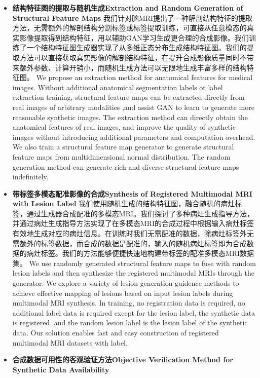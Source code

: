 \documentclass[letterpaper]{article} %
\begin{document}
\begin{itemize}
	\item \textbf{结构特征图的提取与随机生成Extraction and Random Generation of Structural Feature Maps}
	我们针对脑MRI提出了一种解剖结构特征的提取方法，无需额外的解剖结构分割标签或标签提取训练，可直接从任意模态的真实影像提取得到结构特征，用以辅助GAN学习生成更合理的合成影像。我们训练了一个结构特征图生成器实现了从多维正态分布生成结构特征图。我们的提取方法可以直接获取真实影像的解剖结构特征，在提升合成影像质量同时不带来额外参数、计算开销小，而随机生成方法可以无限地生成丰富多样的结构特征图。
	We propose an extraction method for anatomical features for medical images. Without additional anatomical segmentation labels or label extraction training, structural feature maps can be extracted directly from real images of arbitrary modalities ,and assist GAN to learn to generate more reasonable synthetic images. The extraction method can directly obtain the anatomical features of real images, and improve the quality of synthetic images without introducing additional parameters and computation overhead. We also train a structural feature map generator to generate structural feature maps from multidimensional normal distribution. The random generation method can generate rich and diverse structural feature maps indefinitely.
	\item \textbf{带标签多模态配准影像的合成Synthesis of Registered Multimodal MRI with Lesion Label}
	我们使用随机生成的结构特征图，融合随机的病灶标签，通过生成器合成配准的多模态MRI。我们探讨了多种病灶生成指导方法，并通过病灶生成指导方法实现了在多模态MRI的合成过程中根据输入病灶标签有效地生成对应的病灶信息。在训练时我们无需配准的数据，除病灶标签外无需额外的标签数据，而合成的数据是配准的，输入的随机病灶标签即为合成数据的病灶标签。我们的方法能够便捷快速地构建带标签的配准多模态MRI数据集。
	We use randomly generated structural feature maps to fuse with random lesion labels and then synthesize the registered multimodal MRIs through the generator. We explore a variety of lesion generation guidence methods to achieve effective mapping of lesions based on input lesion labels during multimodal MRI synthesis. In training, no registration data is required, no additional label data is required except for the lesion label, the synthetic data is registered, and the random lesion label is the lesion label of the synthetic data. Our solution enables fast and easy construction of registered multimodal MRI datasets with label.
	\item \textbf{合成数据可用性的客观验证方法Objective Verification Method for Synthetic Data Availability}

\end{itemize}
\end{document}
